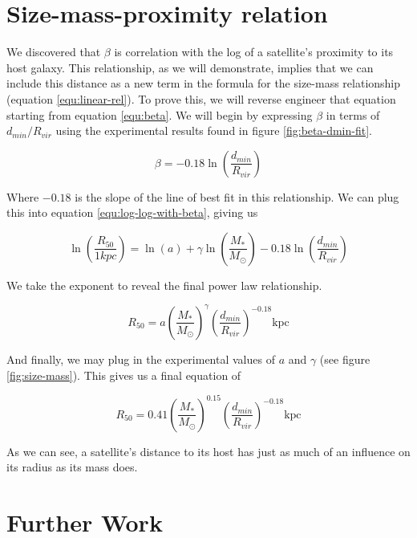 
\section{Size-mass-proximity relation}

We discovered that $\beta$ is correlation with the log of a satellite's proximity to its host galaxy. This relationship, as we will demonstrate, implies that we can include this distance as a new term in the formula for the size-mass relationship (equation \ref{equ:linear-rel}). To prove this, we will reverse engineer that equation starting from equation \ref{equ:beta}. We will begin by expressing $\beta$ in terms of $d_{min} / R_{vir}$ using the experimental results found in figure \ref{fig:beta-dmin-fit}.

\begin{equation}
    \beta = -0.18 \ln\left( \frac{d_{min}}{R_{vir}} \right)
\end{equation}

Where $-0.18$ is the slope of the line of best fit in this relationship. We can plug this into equation \ref{equ:log-log-with-beta}, giving us

\begin{equation}
    \ln \left(
        \frac{R_{50}}{1 kpc}
    \right)
    =
    \ln(a)
    + \gamma \ln \left(
        \frac{M_*}{M_\odot}
    \right)
    -0.18 \ln\left( \frac{d_{min}}{R_{vir}} \right)
\end{equation}

We take the exponent to reveal the final power law relationship.

\begin{equation}
    R_{50} = a
    \left( \frac{M_*}{M_\odot} \right)^\gamma
    \left( \frac{d_{min}}{R_{vir}} \right)^{-0.18}
    \text{kpc}
\end{equation}

And finally, we may plug in the experimental values of $a$ and $\gamma$ (see figure \ref{fig:size-mass}). This gives us a final equation of 

\begin{equation}
    R_{50} = 0.41
    \left( \frac{M_*}{M_\odot} \right)^{0.15}
    \left( \frac{d_{min}}{R_{vir}} \right)^{-0.18}
    \text{kpc}
\end{equation}

As we can see, a satellite's distance to its host has just as much of an influence on its radius as its mass does. 


\section{Further Work}